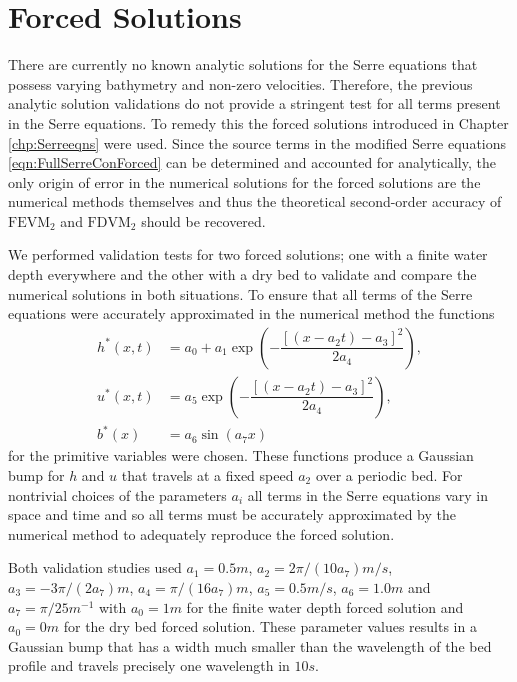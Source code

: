 \section{Forced Solutions}
There are currently no known analytic solutions for the Serre equations that possess varying bathymetry and non-zero velocities. Therefore, the previous analytic solution validations do not provide a stringent test for all terms present in the Serre equations. To remedy this the forced solutions introduced in Chapter \ref{chp:Serreeqns} were used. Since the source terms in the modified Serre equations \eqref{eqn:FullSerreConForced} can be determined and accounted for analytically, the only origin of error in the numerical solutions for the forced solutions are the numerical methods themselves and thus the theoretical second-order accuracy of $\text{FEVM}_2$ and $\text{FDVM}_2$ should be recovered. 

We performed validation tests for two forced solutions; one with a finite water depth everywhere and the other with a dry bed to validate and compare the numerical solutions in both situations. To ensure that all terms of the Serre equations were accurately approximated in the numerical method the functions
\begin{subequations}
\begin{align}
\label{eqn:ForcedSolutionxt}
h^*(x,t) &= a_0 + a_1 \exp\left(-\dfrac{\left[\left(x - a_2 t\right) - a_3\right]^2}{2 a_4}\right), \\
u^*(x,t) &= a_5 \exp\left(-\dfrac{\left[\left(x - a_2 t\right) - a_3\right]^2}{2 a_4}\right), \\
b^*(x) &= a_6 \sin\left(a_7 x\right)
\end{align}
\end{subequations}
for the primitive variables were chosen. These functions produce a Gaussian bump for $h$ and $u$ that travels at a fixed speed $a_2$ over a periodic bed. For nontrivial choices of the parameters $a_i$ all terms in the Serre equations vary in space and time and so all terms must be accurately approximated by the numerical method to adequately reproduce the forced solution. 

Both validation studies used $a_1 = 0.5m$, $a_2 = 2 \pi / \left(10 a_7\right) m/s$, $a_3 = - 3\pi/ \left(2 a_7\right) m$, $a_4 = \pi / (16 a_7) m$, $a_5 = 0.5 m/s$, $a_6 = 1.0 m$ and $a_7 = \pi / 25 m^{-1}$ with $a_0= 1m$ for the finite water depth forced solution and $a_0=0m$ for the dry bed forced solution. These parameter values results in a Gaussian bump that has a width much smaller than the wavelength of the bed profile and travels precisely one wavelength in $10s$.

